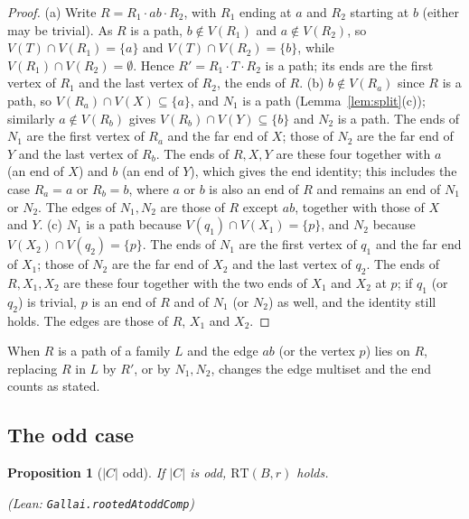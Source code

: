 \documentclass[11pt]{amsart}
\newtheorem{proposition}[theorem]{Proposition}
\theoremstyle{definition}
\theoremstyle{remark}
\renewcommand{\_}{\oldunderscore\allowbreak}
\newcommand{\leanst}[1]{\par{\raggedright\small\textup{(Lean: \texttt{#1})}\par}}
\newcommand{\RT}{\mathrm{RT}}
\begin{document}
\begin{proof}
(a) Write $R=R_1\cdot ab\cdot R_2$, with $R_1$ ending at $a$ and $R_2$ starting at $b$ (either may
be trivial). As $R$ is a path, $b\notin V(R_1)$ and $a\notin V(R_2)$, so $V(T)\cap V(R_1)=\{a\}$ and
$V(T)\cap V(R_2)=\{b\}$, while $V(R_1)\cap V(R_2)=\emptyset$. Hence $R'=R_1\cdot T\cdot R_2$ is a path;
its ends are the first vertex of $R_1$ and the last vertex of $R_2$, the ends of $R$.
(b) $b\notin V(R_a)$ since $R$ is a path, so $V(R_a)\cap V(X)\subseteq\{a\}$, and $N_1$ is a path
(Lemma~\ref{lem:split}(c)); similarly $a\notin V(R_b)$ gives $V(R_b)\cap V(Y)\subseteq\{b\}$ and $N_2$ is
a path. The ends of $N_1$ are the first vertex of $R_a$ and the far end of $X$; those of $N_2$ are the
far end of $Y$ and the last vertex of $R_b$. The ends of $R,X,Y$ are these four together with $a$ (an
end of $X$) and $b$ (an end of $Y$), which gives the end identity; this includes the case $R_a=a$ or
$R_b=b$, where $a$ or $b$ is also an end of $R$ and remains an end of $N_1$ or $N_2$. The edges of
$N_1,N_2$ are those of $R$ except $ab$, together with those of $X$ and $Y$.
(c) $N_1$ is a path because $V(q_1)\cap V(X_1)=\{p\}$, and $N_2$ because $V(X_2)\cap V(q_2)=\{p\}$.
The ends of $N_1$ are the first vertex of $q_1$ and the far end of $X_1$; those of $N_2$ are the far
end of $X_2$ and the last vertex of $q_2$. The ends of $R,X_1,X_2$ are these four together with the
two ends of $X_1$ and $X_2$ at $p$; if $q_1$ (or $q_2$) is trivial, $p$ is an end of $R$ and of $N_1$
(or $N_2$) as well, and the identity still holds. The edges are those of $R$, $X_1$ and $X_2$.
\end{proof}

When $R$ is a path of a family $L$ and the edge $ab$ (or the vertex $p$) lies on $R$, replacing $R$
in $L$ by $R'$, or by $N_1,N_2$, changes the edge multiset and the end counts as stated.

\subsection{The odd case}

\begin{proposition}[$|C|$ odd]\label{prop:odd}
If $|C|$ is odd, $\RT(B,r)$ holds.
\leanst{Gallai.rootedAt\_oddComp}
\end{proposition}
\end{document}
